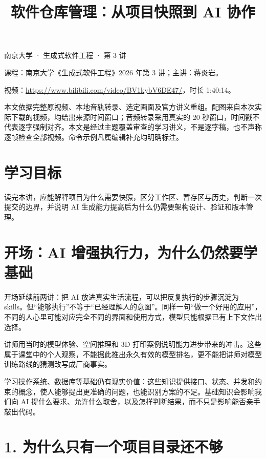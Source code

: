 \documentclass[
  11pt,
  fontset=fandol]{ctexart}
\title{软件仓库管理：从项目快照到 AI 协作}
\author{}
\date{}
\renewcommand{\maketitle}{%
  \begin{center}
  {\LARGE\sffamily\bfseries\color{inkblue}\thetitle\par}
  \vspace{5mm}
  {\small\sffamily\color{muted}南京大学 · 生成式软件工程 · 第 3 讲}
  \end{center}\vspace{4mm}\thispagestyle{fancy}}
\begin{document}
\maketitle

课程：南京大学《生成式软件工程》2026 年第 3 讲；主讲：蒋炎岩。

视频：\url{https://www.bilibili.com/video/BV1kybV6DE47/}，时长 1:40:14。

本文依据完整原视频、本地音轨转录、选定画面及官方讲义重组。配图来自本次实际下载的视频，均给出来源时间窗口；音频转录采用真实的
20
秒窗口，时间戳不代表逐字强制对齐。本文是经过主题覆盖审查的学习讲义，不是逐字稿，也不声称逐帧检查全部视频。命令示例凡属编辑补充均明确标注。

\section{学习目标}\label{ux5b66ux4e60ux76eeux6807}

读完本讲，应能解释项目为什么需要快照，区分工作区、暂存区与历史，判断一次提交的边界，并说明
AI 生成能力提高后为什么仍需要架构设计、验证和版本管理。

\section{开场：AI
增强执行力，为什么仍然要学基础}\label{ux5f00ux573aai-ux589eux5f3aux6267ux884cux529bux4e3aux4ec0ux4e48ux4ecdux7136ux8981ux5b66ux57faux7840}

开场延续前两讲：把 AI 放进真实生活流程，可以把反复执行的步骤沉淀为
skills。但``能够执行''不等于``已经理解人的意图''。同样一句``做一个好用的应用''，不同的人心里可能对应完全不同的界面和使用方式，模型只能根据已有上下文作出选择。

讲师用当时的模型体验、空间推理和 3D
打印案例说明能力进步带来的冲击。这些属于课堂中的个人观察，不能据此推出永久有效的模型排名，更不能把讲师对模型训练路线的猜测改写成厂商事实。

学习操作系统、数据库等基础仍有现实价值：这些知识提供接口、状态、并发和约束的概念，使人能够提出更准确的问题，也能识别方案的不足。基础知识会影响我们向
AI
提什么要求、允许什么取舍，以及怎样判断结果，而不只是影响能否亲手敲出代码。

\section{1.
为什么只有一个项目目录还不够}\label{ux4e3aux4ec0ux4e48ux53eaux6709ux4e00ux4e2aux9879ux76eeux76eeux5f55ux8fd8ux4e0dux591f}
\end{document}
